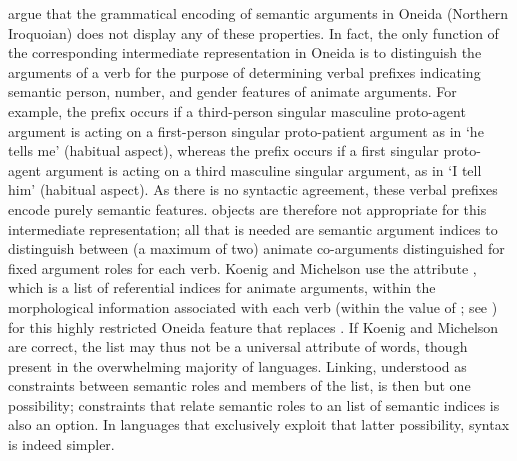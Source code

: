 \documentclass[output=paper
	        ,collection
	        ,collectionchapter
 	        ,biblatex
                ,babelshorthands
                ,newtxmath
                ,draftmode
                ,colorlinks, citecolor=brown
]{langscibook}
\begin{document}
\citet{KoenigandMichelson2014,KoenigandMichelson2015a,KoenigandMichelson2015b} argue that the grammatical encoding of semantic arguments in Oneida (Northern Iroquoian)  does not display any of these properties.  In fact, the only function of the
corresponding intermediate representation in Oneida is to distinguish
the arguments of a verb for the purpose of determining verbal
prefixes indicating semantic person, number, and gender
features of animate arguments.  
For example,  the prefix  occurs if a third-person singular masculine proto-agent argument is acting on a first-person singular proto-patient argument as in   `he tells me’ (habitual aspect), whereas  the prefix  occurs if a first singular proto-agent argument is acting on a third masculine singular argument, as in  `I tell him’ (habitual aspect).
 As there is no syntactic agreement, these verbal prefixes encode purely semantic features.
 objects are therefore not appropriate for this intermediate
representation; all that is needed are semantic argument indices to
distinguish between (a maximum of two) animate co-arguments
distinguished for fixed argument roles for each verb.
Koenig and Michelson use the attribute , which is a list of referential indices for animate arguments, within the morphological information associated with each verb (within the value of ; see ) for this highly restricted
Oneida feature that replaces \argst. If Koenig and Michelson are correct, the \argst list may thus not be a universal attribute of words, though present in the overwhelming majority of languages.
Linking, understood as constraints between semantic roles and members of the \argst list, is then but one possibility; constraints that relate semantic roles to an  list of semantic indices is also an option.
In languages that exclusively exploit that latter possibility, syntax is indeed simpler.
\end{document}
